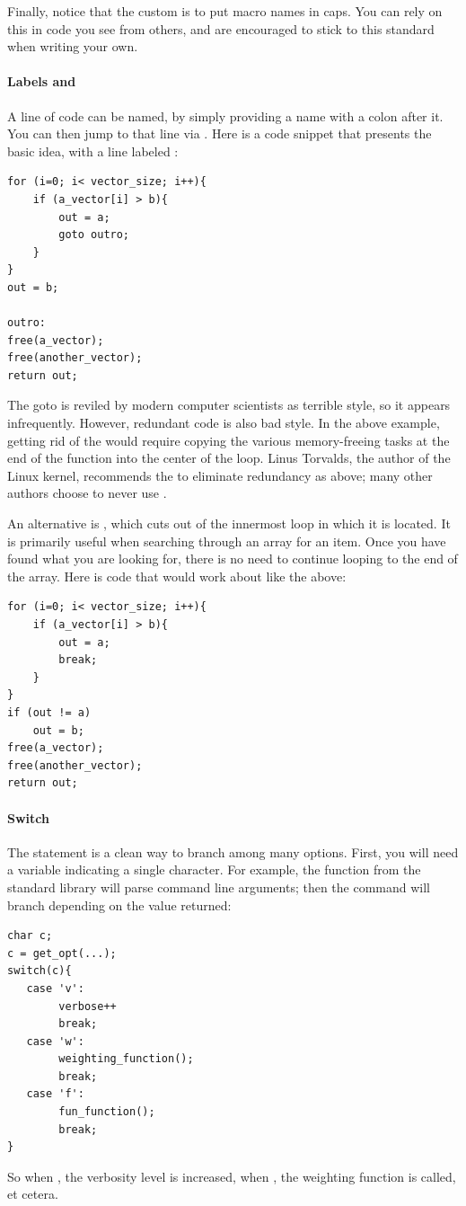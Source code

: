 Finally, notice that the custom is to put macro names in caps.  You can
rely on this in code you see from others, and are encouraged to stick
to this standard when writing your own.

\paragraph{Labels and } A line of code can be named, by simply providing a
name with a colon after it. You can then jump to that line via . Here is a code snippet that presents the basic idea, with a line labeled :
\begin{lstlisting}
for (i=0; i< vector_size; i++){
    if (a_vector[i] > b){
        out = a;
        goto outro;
    }
}
out = b;

outro:
free(a_vector);
free(another_vector);
return out;
\end{lstlisting}
The goto is reviled by modern computer scientists as terrible style, so
it appears infrequently. However, redundant code is also bad style. 
In the above example, getting rid of the  would require copying
the various memory-freeing tasks at the end of the function into the
center of the  loop.  Linus Torvalds,
the author of the Linux kernel, recommends the  to eliminate
redundancy as above; many other authors choose to never use .

An alternative is , which cuts out of the innermost loop in
which it is located. It is primarily useful when searching through an
array for an item. Once you have found what you are looking for, there
is no need to continue looping to the end of the array.
Here is code that would work about like the above:
\begin{lstlisting}
for (i=0; i< vector_size; i++){
    if (a_vector[i] > b){
        out = a;
        break;
    }
}
if (out != a)
    out = b;
free(a_vector);
free(another_vector);
return out;
\end{lstlisting}

\paragraph{Switch} The  statement is a clean way to
branch among many options. First, you will need a variable indicating
a single character. For example, the  function from the
standard library will parse command line arguments; then the 
command will branch depending on the value returned:
\begin{lstlisting}
char c;
c = get_opt(...);
switch(c){
   case 'v':
        verbose++
        break;
   case 'w':    
        weighting_function();
        break;
   case 'f':      
        fun_function();
        break;
}
\end{lstlisting}
So when 
, the verbosity level is increased,
when , the weighting function is called, 
et cetera.


